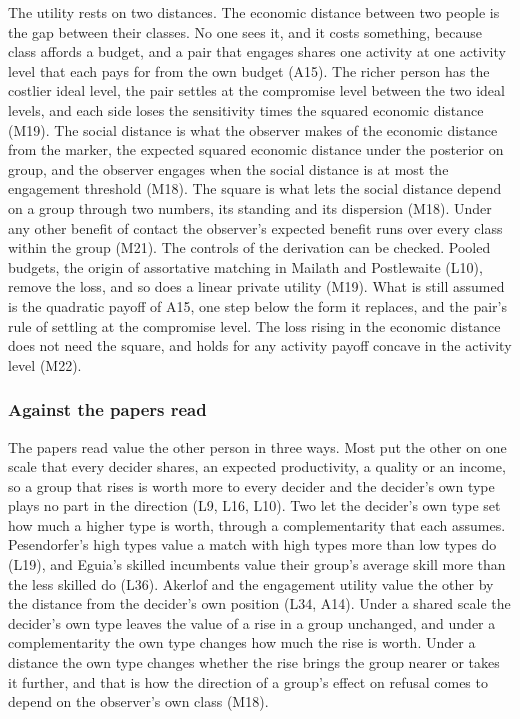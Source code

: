 The utility rests on two distances. The economic distance between two
people is the gap between their classes. No one sees it, and it costs
something, because class affords a budget, and a pair that engages shares
one activity at one activity level that each pays for from the own budget
(A15). The richer person has the costlier ideal level, the pair settles at the
compromise level between the two ideal levels, and each side loses the
sensitivity times the squared economic distance (M19). The social distance
is what the observer makes of the economic distance from the marker, the
expected squared economic distance under the posterior on group, and the
observer engages when the social distance is at most the engagement
threshold (M18). The square is what lets the social distance depend on a
group through two numbers, its standing and its dispersion (M18). Under any
other benefit of contact the observer's expected benefit runs over every
class within the group (M21). The controls of the derivation can be
checked. Pooled budgets, the origin of assortative matching in Mailath and
Postlewaite (L10), remove the loss, and so does a linear private utility
(M19). What is still assumed is the quadratic payoff of A15, one step below
the form it replaces, and the pair's rule of settling at the compromise
level. The loss rising in the economic distance does not need the square,
and holds for any activity payoff concave in the activity level (M22).

\subsubsection{Against the papers read}

The papers read value the other person in three ways. Most put the other
on one scale that every decider shares, an expected productivity, a quality
or an income, so a group that rises is worth more to every decider and the
decider's own type plays no part in the direction (L9, L16, L10). Two let
the decider's own type set how much a higher type is worth, through a
complementarity that each assumes. Pesendorfer's high types value a match
with high types more than low types do (L19), and Eguia's skilled
incumbents value their group's average skill more than the less skilled do
(L36). Akerlof and the engagement utility value the other by the distance
from the decider's own position (L34, A14). Under a shared scale the
decider's own type leaves the value of a rise in a group unchanged, and
under a complementarity the own type changes how much the rise is worth.
Under a distance the own type changes whether the rise brings the group
nearer or takes it further, and that is how the direction of a group's
effect on refusal comes to depend on the observer's own class (M18).

